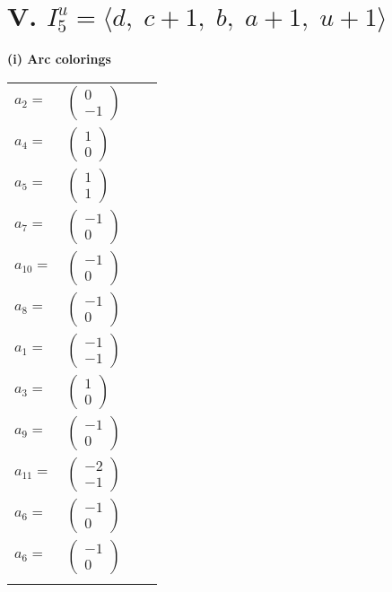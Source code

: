 \documentclass[1p]{elsarticle_modified}
\theoremstyle{definition}
\begin{document}
\centering \section*{V. $I^u_{5}= \langle d,\;c+1,\;b,\;a+1,\;u+1 \rangle$}
\flushleft \textbf{(i) Arc colorings}\\
\begin{tabular}{m{7pt} m{180pt} m{7pt} m{180pt} }
\flushright $a_{2}=$&$\begin{pmatrix}0\\-1\end{pmatrix}$ \\
\flushright $a_{4}=$&$\begin{pmatrix}1\\0\end{pmatrix}$ \\
\flushright $a_{5}=$&$\begin{pmatrix}1\\1\end{pmatrix}$ \\
\flushright $a_{7}=$&$\begin{pmatrix}-1\\0\end{pmatrix}$ \\
\flushright $a_{10}=$&$\begin{pmatrix}-1\\0\end{pmatrix}$ \\
\flushright $a_{8}=$&$\begin{pmatrix}-1\\0\end{pmatrix}$ \\
\flushright $a_{1}=$&$\begin{pmatrix}-1\\-1\end{pmatrix}$ \\
\flushright $a_{3}=$&$\begin{pmatrix}1\\0\end{pmatrix}$ \\
\flushright $a_{9}=$&$\begin{pmatrix}-1\\0\end{pmatrix}$ \\
\flushright $a_{11}=$&$\begin{pmatrix}-2\\-1\end{pmatrix}$ \\
\flushright $a_{6}=$&$\begin{pmatrix}-1\\0\end{pmatrix}$\\ \flushright $a_{6}=$&$\begin{pmatrix}-1\\0\end{pmatrix}$\\&\end{tabular}
\end{document}
